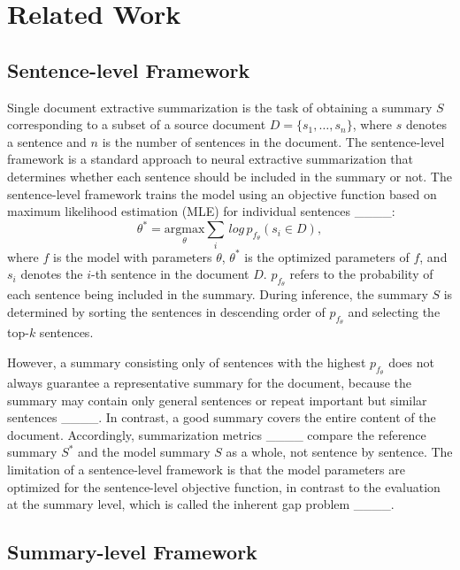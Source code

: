 \section{Related Work}
\subsection{Sentence-level Framework}

Single document extractive summarization is the task of obtaining a summary $S$ corresponding to a subset of a source document $D = \{s_1, \ldots, s_n\}$, where $s$ denotes a sentence and $n$ is the number of sentences in the document. The sentence-level framework is a standard approach to neural extractive summarization that determines whether each sentence should be included in the summary or not. The sentence-level framework trains the model using an objective function based on maximum likelihood estimation (MLE) for individual sentences ____:
\begin{equation}
\label{eq1}
\theta^* = \underset{\theta}{\text{argmax}} \underset{i}\sum \, log \, p_{f_{\theta}}(s_i \in D),
\end{equation}
where $f$ is the model with parameters $\theta$, $\theta^*$ is the optimized parameters of $f$, and $s_i$ denotes the $i$-th sentence in the document $D$. $p_{f_{\theta}}$ refers to the probability of each sentence being included in the summary. During inference, the summary $S$ is determined by sorting the sentences in descending order of $p_{f_{\theta}}$ and selecting the top-$k$ sentences.

However, a summary consisting only of sentences with the highest $p_{f_{\theta}}$ does not always guarantee a representative summary for the document, because the summary may contain only general sentences or repeat important but similar sentences ____. In contrast, a good summary covers the entire content of the document. Accordingly, summarization metrics ____ compare the reference summary $S^*$ and the model summary $S$ as a whole, not sentence by sentence. The limitation of a sentence-level framework is that the model parameters are optimized for the sentence-level objective function, in contrast to the evaluation at the summary level, which is called the inherent gap problem ____.


\subsection{Summary-level Framework}

